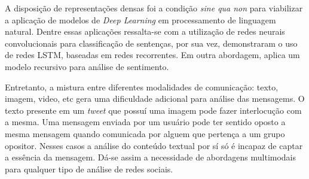 A disposição de representações densas foi a condição \textit{sine qua non} para
viabilizar a aplicação de modelos de \textit{Deep Learning} em processamento de
linguagem natural.
Dentre essas aplicações ressalta-se \citet{kim14} com a utilização de redes
neurais convolucionais para classificação de sentenças, por sua vez,
\citet{zhou16} demonstraram o uso de redes LSTM, baseadas em redes recorrentes.
Em outra abordagem, \citet{socher13} aplica um modelo recursivo para análise de
sentimento.

Entretanto, a mistura entre diferentes modalidades de comunicação: texto, imagem,
video, etc gera uma dificuldade adicional para análise das mensagems.
O texto presente em um \textit{tweet} que possuí uma imagem pode fazer
interlocução com a mesma.
Uma mensagem enviada por um usuário pode ter sentido oposto a mesma mensagem
quando comunicada por alguem que pertença a um grupo opositor.
Nesses casos a análise do conteúdo textual por sí só é incapaz de captar a
essência da mensagem.
Dá-se assim a necessidade de abordagens multimodais para qualquer tipo de
análise de redes sociais.




